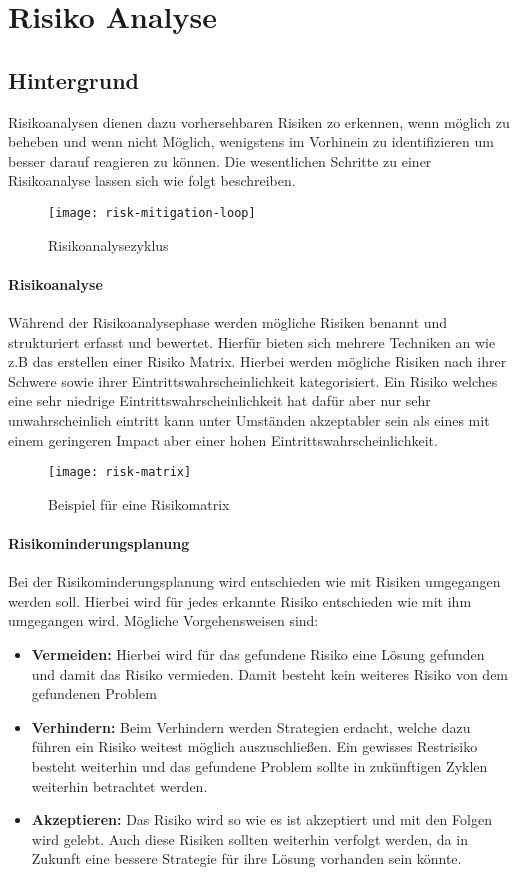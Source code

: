 \chapter{Risiko Analyse}

\section{Hintergrund}
Risikoanalysen dienen dazu vorhersehbaren Risiken zo erkennen, wenn möglich zu beheben und wenn nicht Möglich, wenigstens im Vorhinein zu identifizieren um besser darauf reagieren zu können. Die wesentlichen Schritte zu einer Risikoanalyse lassen sich wie folgt beschreiben.
\begin{figure}[H]
	\centering
	\texttt{[image: risk-mitigation-loop]}
    \caption{Risikoanalysezyklus \cite{osti_1494012}}
	\label{fig:r1}
\end{figure} 
\subsubsection{Risikoanalyse}
Während der Risikoanalysephase werden mögliche Risiken benannt und strukturiert erfasst und bewertet. Hierfür bieten sich mehrere Techniken an wie z.B das erstellen einer Risiko Matrix. Hierbei werden mögliche Risiken nach ihrer Schwere sowie ihrer Eintrittswahrscheinlichkeit kategorisiert. Ein Risiko welches eine sehr niedrige Eintrittswahrscheinlichkeit hat dafür aber nur sehr unwahrscheinlich eintritt kann unter Umständen akzeptabler sein als eines mit einem geringeren Impact aber einer hohen Eintrittswahrscheinlichkeit.
\begin{figure}[H]
	\centering
	\texttt{[image: risk-matrix]}
    \caption{Beispiel für eine Risikomatrix \cite{risk2022}}
	\label{fig:r2}
\end{figure} 
\subsubsection{Risikominderungsplanung}
Bei der Risikominderungsplanung wird entschieden wie mit Risiken umgegangen werden soll. Hierbei wird für jedes erkannte Risiko entschieden wie mit ihm umgegangen wird. Mögliche Vorgehensweisen sind:
\begin{itemize}
    \item \textbf{Vermeiden:} Hierbei wird für das gefundene Risiko eine Lösung gefunden und damit das Risiko vermieden. Damit besteht kein weiteres Risiko von dem gefundenen Problem 
    \item \textbf{Verhindern:} Beim Verhindern werden Strategien erdacht, welche dazu führen ein Risiko weitest möglich auszuschließen. Ein gewisses Restrisiko besteht weiterhin und das gefundene Problem sollte in zukünftigen Zyklen weiterhin betrachtet werden. 
    \item \textbf{Akzeptieren:} Das Risiko wird so wie es ist akzeptiert und mit den Folgen wird gelebt. Auch diese Risiken sollten weiterhin verfolgt werden, da in Zukunft eine bessere Strategie für ihre Lösung vorhanden sein könnte.
\end{itemize}
